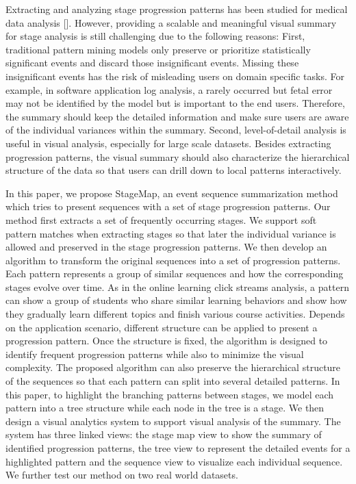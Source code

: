 Extracting and analyzing stage progression patterns has been studied for medical data analysis []. However, providing a scalable and meaningful visual summary for stage analysis is still challenging due to the following reasons: First, traditional pattern mining models only preserve or prioritize statistically significant events and discard those insignificant events. Missing these insignificant events has the risk of misleading users on domain specific tasks. For example, in software application log analysis, a rarely occurred but fetal error may not be identified by the model but is important to the end users. Therefore, the summary should keep the detailed information and make sure users are aware of the individual variances within the summary. Second, level-of-detail analysis is useful in visual analysis, especially for large scale datasets. Besides extracting progression patterns, the visual summary should also characterize the hierarchical structure of the data so that users can drill down to local patterns interactively. 

In this paper, we propose StageMap, an event sequence summarization method which tries to present sequences with a set of stage progression patterns. Our method first extracts a set of frequently occurring stages. We support soft pattern matches when extracting stages so that later the individual variance is allowed and preserved in the stage progression patterns. We then develop an algorithm to transform the original sequences into a set of progression patterns. Each pattern represents a group of similar sequences and how the corresponding stages evolve over time. As in the online learning click streams analysis, a pattern can show a group of students who share similar learning behaviors and show how they gradually learn different topics and finish various course activities. Depends on the application scenario, different structure can be applied to present a progression pattern. Once the structure is fixed, the algorithm is designed to identify frequent progression patterns while also to minimize the visual complexity. The proposed algorithm can also preserve the hierarchical structure of the sequences so that each pattern can split into several detailed patterns. In this paper, to highlight the branching patterns between stages, we model each pattern into a tree structure while each node in the tree is a stage. We then design a visual analytics system to support visual analysis of the summary. The system has three linked views: the stage map view to show the summary of identified progression patterns, the tree view to represent the detailed events for a highlighted pattern and the sequence view to visualize each individual sequence. We further test our method on two real world datasets. 

